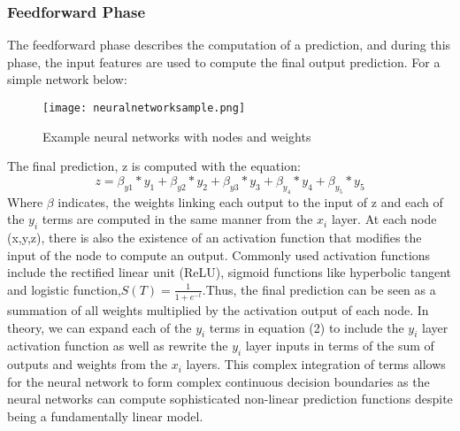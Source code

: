 \documentclass{article}
\begin{document}
\subsubsection{Feedforward Phase}
The feedforward phase describes the computation of a prediction, and during this phase, the input features are used to compute the final output prediction. For a simple network below:
\begin{figure}[H]
\texttt{[image: neuralnetworksample.png]}
\caption{Example neural networks with nodes and weights}
\centering
\end{figure}
The final prediction, z is computed with the equation:
\begin{equation}
z = \beta_{y1} * y_1 + \beta_{y2} * y_2 + \beta_{y3} * y_3 + \beta_{y_4} * y_4 + \beta_{y_5} * y_5
\end{equation}
Where $\beta$ indicates, the weights linking each output to the input of z and each of the $y_i$ terms are computed in the same manner from the $x_i$ layer. At each node (x,y,z), there is also the existence of an activation function that modifies the input of the node to compute an output. Commonly used activation functions include the rectified linear unit (ReLU), sigmoid functions like hyperbolic tangent and logistic function,$ S(T)=\frac{1}{1+e^{-t}}$.Thus, the final prediction can be seen as a summation of all weights multiplied by the activation output of each node. In theory, we can expand each of the $y_i$ terms in equation (2) to include the $y_i$ layer activation function as well as rewrite the $y_i$ layer inputs in terms of the sum of outputs and weights from the $x_i$ layers. This complex integration of terms allows for the neural network to form complex continuous decision boundaries as the neural networks can compute sophisticated non-linear prediction functions despite being a fundamentally linear model.
\end{document}
